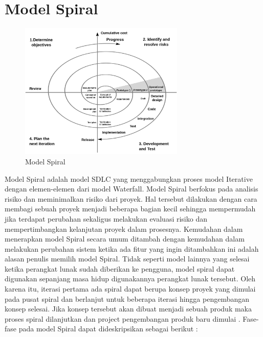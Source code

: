 \section{Model Spiral} 

\begin{figure}[H]
	\centering
	\includegraphics[width=0.7\textwidth]{gambar/Spiral}
	\caption{Model Spiral}
\end{figure}
Model Spiral adalah model SDLC yang menggabungkan proses model Iterative dengan elemen-elemen dari model Waterfall. Model Spiral berfokus pada analisis risiko dan meminimalkan risiko dari proyek. Hal tersebut dilakukan dengan cara membagi sebuah proyek menjadi beberapa bagian kecil sehingga mempermudah jika terdapat perubahan sekaligus melakukan evaluasi risiko dan mempertimbangkan kelanjutan proyek dalam prosesnya. Kemudahan dalam menerapkan model Spiral secara umum ditambah dengan kemudahan dalam melakukan perubahan sistem ketika ada fitur yang ingin ditambahkan ini adalah alasan penulis memilih model Spiral. Tidak seperti model lainnya yang selesai ketika perangkat lunak sudah diberikan ke pengguna, model spiral dapat digunakan sepanjang masa hidup digunakannya perangkat lunak tersebut. Oleh karena itu, iterasi pertama ada spiral dapat berupa konsep proyek yang dimulai pada pusat spiral dan berlanjut untuk beberapa iterasi hingga pengembangan konsep selesai. Jika konsep tersebut akan dibuat menjadi sebuah produk maka proses spiral dilanjutkan dan project pengembangan produk baru dimulai \citep{Pressman2010}. Fase-fase pada model Spiral dapat dideskripsikan sebagai berikut \citep{Alshamrani2015}: 

